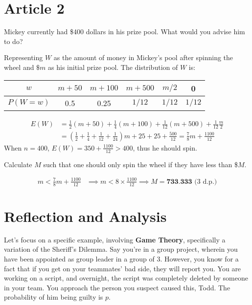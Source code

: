 \documentclass[12pt]{exam}
\begin{document}
\section{Article 2}
\begin{questions}
\question Mickey currently had \$400 dollars in his prize pool. What would you advise him to do?
\begin{tcolorbox}
Representing $W$ as the amount of money in Mickey's pool after spinning the wheel and $\$m$ as his initial prize pool. The distribution of $W$ is:
\vspace{-0.2cm}
\begin{table}[H]
    \centering
    \begin{tabular}{|c|c|c|c|c|c|}
        \hline $w$ & $m + 50$ & $m+100$ & $m+500$ & $m/2$ & 0  \\
        \hline $P(W=w)$ & 0.5 & 0.25 & $1/12$ & $1/12$& $1/12$ \\
        \hline
    \end{tabular}
\end{table}
\vspace{-1cm}
\begin{align*}
    E(W) &= \frac{1}{2}\left(m+50\right)+\frac{1}{4}\left(m+100\right)+\frac{1}{12}\left(m+500\right)+\frac{1}{12}\frac{m}{2} \\
    &= \left(\frac{1}{2}+\frac{1}{4}+\frac{1}{12}+\frac{1}{24}\right)m + 25 + 25 + \frac{500}{12} = \frac{7}{8} m + \frac{1100}{12}
\end{align*}
When $n = 400$, $E(W) = 350 + \frac{1100}{12} > 400$, thus he should spin.
\end{tcolorbox}
\question Calculate $M$ such that one should only spin the wheel if they have less than \$$M$.
\begin{tcolorbox}\vspace{-0.5cm}
\begin{align*}
    m < \frac{7}{8} m + \frac{1100}{12} &\implies m < 8 \times \frac{1100}{12} \implies M = \textbf{733.333}\text{ (3 d.p.)}
\end{align*}
\end{tcolorbox}
\end{questions}


\section{Reflection and Analysis}
Let's focus on a specific example, involving \textbf{Game Theory}, specifically a variation of the Sheriff's Dilemma. Say you're in a group project, wherein you have been appointed as group leader in a group of 3. However, you know for a fact that if you get on your teammates' bad side, they will report you. You are working on a script, and overnight, the script was completely deleted by someone in your team. You approach the person you suspect caused this, Todd. The probability of him being guilty is $p$. \\
\end{document}
